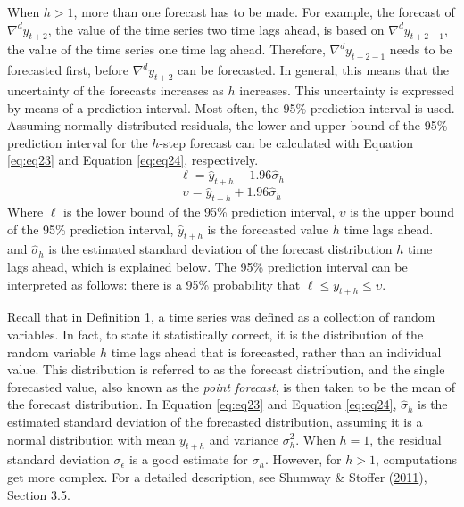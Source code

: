 \documentclass[12pt,oneside]{reedthesis}
\begin{document}
When \(h > 1\), more than one forecast has to be made. For example, the
forecast of \(\nabla^{d}y_{t+2}\), the value of the time series two time
lags ahead, is based on \(\nabla^{d}y_{t+2-1}\), the value of the time
series one time lag ahead. Therefore, \(\nabla^{d}y_{t+2-1}\) needs to
be forecasted first, before \(\nabla^{d}y_{t+2}\) can be forecasted. In
general, this means that the uncertainty of the forecasts increases as
\(h\) increases. This uncertainty is expressed by means of a prediction
interval. Most often, the 95\% prediction interval is used. Assuming
normally distributed residuals, the lower and upper bound of the 95\%
prediction interval for the \(h\)-step forecast can be calculated with
Equation \eqref{eq:eq23} and Equation \eqref{eq:eq24}, respectively.
\begin{equation}
\ell = \hat{y}_{t+h} - 1.96\hat\sigma_{h}
\label{eq:eq23}
\end{equation}\begin{equation}
\upsilon = \hat{y}_{t+h} + 1.96\hat\sigma_{h}
\label{eq:eq24}
\end{equation}
Where \(\ell\) is the lower bound of the 95\% prediction interval,
\(\upsilon\) is the upper bound of the 95\% prediction interval,
\(\hat{y}_{t+h}\) is the forecasted value \(h\) time lags ahead. and
\(\hat\sigma_{h}\) is the estimated standard deviation of the forecast
distribution \(h\) time lags ahead, which is explained below. The 95\%
prediction interval can be interpreted as follows: there is a 95\%
probability that \(\ell \leq {y}_{t+h} \leq \upsilon\).

Recall that in Definition 1, a time series was defined as a collection
of random variables. In fact, to state it statistically correct, it is
the distribution of the random variable \(h\) time lags ahead that is
forecasted, rather than an individual value. This distribution is
referred to as the forecast distribution, and the single forecasted
value, also known as the \emph{point forecast}, is then taken to be the
mean of the forecast distribution. In Equation \eqref{eq:eq23} and
Equation \eqref{eq:eq24}, \(\hat\sigma_{h}\) is the estimated standard
deviation of the forecasted distribution, assuming it is a normal
distribution with mean \({y}_{t+h}\) and variance \(\sigma_{h}^{2}\).
When \(h = 1\), the residual standard deviation \(\sigma_{\epsilon}\) is
a good estimate for \(\sigma_{h}\). However, for \(h > 1\), computations
get more complex. For a detailed description, see Shumway \& Stoffer
(\protect\hyperlink{ref-shumway2011}{2011}), Section 3.5.
\end{document}
